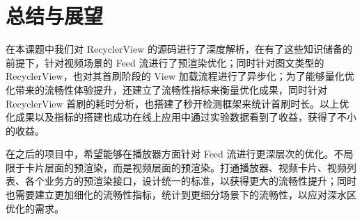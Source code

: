 \chapter{总结与展望}

在本课题中我们对 RecyclerView 的源码进行了深度解析，在有了这些知识储备的前提下，针对视频场景的 Feed 流进行了预渲染优化；同时针对图文类型的 RecyclerView，也对其首刷阶段的 View 加载流程进行了异步化；为了能够量化优化带来的流畅性体验提升，还建立了流畅性指标来衡量优化成果，同时针对 RecyclerView 首刷的耗时分析，也搭建了秒开检测框架来统计首刷时长。以上优化成果以及指标的搭建也成功在线上应用中通过实验数据看到了收益，获得了不小的收益。

在之后的项目中，希望能够在播放器方面针对 Feed 流进行更深层次的优化。不局限于卡片层面的预渲染，而是视频层面的预渲染。打通播放器、视频卡片、视频列表、各个业务方的预渲染接口，设计统一的标准，以获得更大的流畅性提升；同时也需要建立更加细化的流畅性指标，统计到更细分场景下的流畅性，以应对深水区优化的需求。